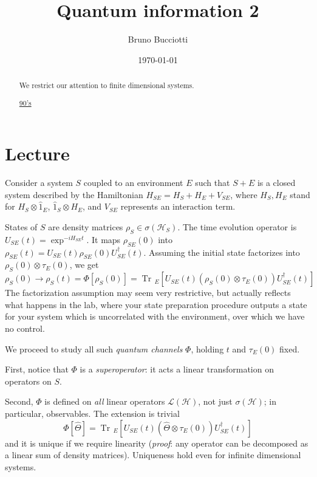 \documentclass[a4paper, 11pt]{article}
\date{\today}
\author{Bruno Bucciotti}
\title{Quantum information 2}
\newcommand{\Tr}{\mathop{\mathrm{Tr}\!}{}}
\newcommand{\HH}{\mathcal{H}}
\begin{document}
	\maketitle
	
	\begin{abstract}
		We restrict our attention to finite dimensional systems.
		
		\href{https://www.youtube.com/watch?v=GyKcdbFGeV8}{90's}
		
	\end{abstract}

	\tableofcontents
	\clearpage
	\section{Lecture}
	Consider a system $S$ coupled to an environment $E$ such that $S+E$ is a closed system described by the Hamiltonian $H_{SE} = H_S + H_E + V_{SE}$, where $H_S,H_E$ stand for $H_S\otimes \hat{1}_E$, $\hat{1}_S\otimes H_E$, and $V_{SE}$ represents an interaction term.
	
	States of $S$ are density matrices $\rho_S\in\sigma(\HH_S)$.
	The time evolution operator is $U_{SE}(t) = \exp^{-i H_{SE} t}$. It maps $\rho_{SE}(0)$ into $\rho_{SE}(t) = U_{SE}(t) \rho_{SE}(0) U^\dagger_{SE}(t)$. Assuming the initial state factorizes into $\rho_S(0)\otimes\tau_E(0)$, we get
	\[ \rho_S(0)\rightarrow \rho_S(t) = \Phi\left[\rho_S(0)\right] = \Tr_E\left[ U_{SE}(t) \left(\rho_S(0)\otimes\tau_E(0)\right) U^\dagger_{SE}(t) \right] \]
	The factorization assumption may seem very restrictive, but actually reflects what happens in the lab, where your state preparation procedure outputs a state for your system which is uncorrelated with the environment, over which we have no control.
	\vspace{5mm}
	
	We proceed to study all such \emph{quantum channels} $\Phi$, holding $t$ and $\tau_E(0)$ fixed.
	
	\noindent First, notice that $\Phi$ is a \emph{superoperator}: it acts a linear transformation on operators on $S$.
	
	\noindent Second, $\Phi$ is defined on \emph{all} linear operators $\mathcal{L}(\HH)$, not just $\sigma(\HH)$; in particular, observables. The extension is trivial
	\[ \Phi\left[\hat{\Theta}\right] = \Tr_E\left[ U_{SE}(t) \left(\hat{\Theta}\otimes\tau_E(0)\right) U^\dagger_{SE}(t) \right] \]
	and it is unique if we require linearity (\emph{proof}: any operator can be decomposed as a linear sum of density matrices). Uniqueness hold even for infinite dimensional systems.
	
\end{document}

